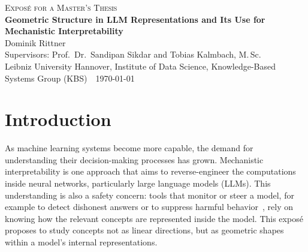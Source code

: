 \documentclass[11pt,a4paper]{article}
\newcommand{\thesistitle}{Geometric Structure in LLM Representations and Its Use for Mechanistic Interpretability}
\newcommand{\authorname}{Dominik Rittner}
\newcommand{\supervisor}{Prof.\ Dr.\ Sandipan Sikdar and Tobias Kalmbach, M.\,Sc.}
\newcommand{\university}{Leibniz University Hannover, Institute of Data Science, Knowledge-Based Systems Group (KBS)}
\begin{document}
\begin{center}
  {\small\scshape Exposé for a Master's Thesis}\\[0.4ex]
  {\Large\bfseries \thesistitle}\\[0.8ex]
  \authorname\\
  Supervisors: \supervisor\\
  \university\ \textbullet\ \today
\end{center}


\section{Introduction}
As machine learning systems become more capable, the demand for understanding their decision-making processes has grown. Mechanistic interpretability is one approach that aims to reverse-engineer the computations inside neural networks, particularly large language models (LLMs).
This understanding is also a safety concern: tools that monitor or steer a model, for example to detect dishonest answers or to suppress harmful behavior~\cite{zou2023representation}, rely on knowing how the relevant concepts are represented inside the model.
This exposé proposes to study concepts not as linear directions, but as geometric shapes within a model's internal representations.
\end{document}
